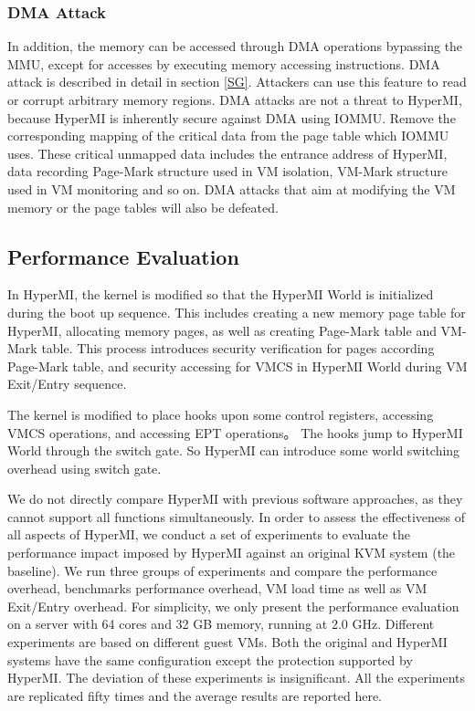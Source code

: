 \documentclass[conference]{IEEEtran}
\begin{document}
\subsubsection{DMA Attack}

In addition, the memory can be accessed through DMA operations bypassing the MMU, except for accesses by executing memory accessing instructions. DMA attack is described in detail in section \ref{SG}. Attackers can use this feature to read or corrupt arbitrary memory regions. DMA attacks are not a threat to HyperMI, because HyperMI is inherently secure against DMA using IOMMU. Remove the corresponding mapping of the critical data from the page table which IOMMU uses. These critical unmapped data includes the entrance address of HyperMI, data recording Page-Mark structure used in VM isolation, VM-Mark structure used in VM monitoring and so on. DMA attacks that aim at modifying the VM memory or the page tables will also be defeated.



\subsection{Performance Evaluation}

In HyperMI, the kernel is modified so that the HyperMI World is initialized during the boot up sequence. This includes creating a new memory page table for HyperMI, allocating memory pages, as well as creating Page-Mark table and VM-Mark table. This process introduces security verification for pages according Page-Mark table, and security accessing for VMCS in HyperMI World during VM Exit/Entry sequence.

The kernel is modified to place hooks upon some control registers, accessing VMCS operations, and accessing EPT operations。
 The hooks jump to HyperMI World through the switch gate. So HyperMI can introduce some world switching overhead using switch gate.

We do not directly compare HyperMI with previous software approaches, as they cannot support all functions simultaneously. In order to assess the effectiveness of all aspects of HyperMI, we conduct a set of experiments to evaluate the performance impact imposed by HyperMI against an original KVM system (the baseline). We run three groups of experiments and compare the performance overhead, benchmarks performance overhead, VM load time as well as VM Exit/Entry overhead.
For simplicity, we only present the performance evaluation on a server with 64 cores and 32 GB memory, running at 2.0 GHz. Different experiments are based on different guest VMs. Both the original and HyperMI systems have the same configuration except the protection supported by HyperMI. The deviation of these experiments is insignificant. All the experiments are replicated fifty times and the average results are reported here.
\end{document}
